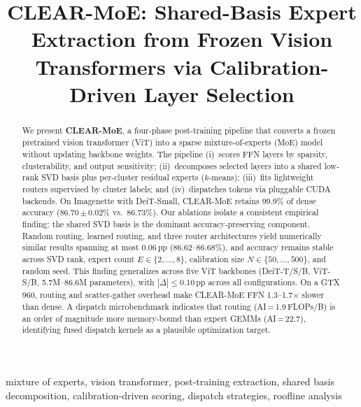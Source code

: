 \documentclass[conference]{IEEEtran}
\begin{document}
\title{CLEAR-MoE: Shared-Basis Expert Extraction from Frozen Vision Transformers via Calibration-Driven Layer Selection}

\maketitle

\begin{abstract}
We present \textbf{CLEAR-MoE}, a four-phase post-training pipeline that converts a frozen pretrained vision transformer (ViT) into a sparse mixture-of-experts (MoE) model without updating backbone weights. The pipeline (i)~scores FFN layers by sparsity, clusterability, and output sensitivity; (ii)~decomposes selected layers into a shared low-rank SVD basis plus per-cluster residual experts ($k$-means); (iii)~fits lightweight routers supervised by cluster labels; and (iv)~dispatches tokens via pluggable CUDA backends. On Imagenette with DeiT-Small, CLEAR-MoE retains 99.9\% of dense accuracy (86.70\,$\pm$\,0.02\% vs.\ 86.73\%). Our ablations isolate a consistent empirical finding: the shared SVD basis is the dominant accuracy-preserving component. Random routing, learned routing, and three router architectures yield numerically similar results spanning at most 0.06\,pp (86.62--86.68\%), and accuracy remains stable across SVD rank, expert count $E \in \{2,\ldots,8\}$, calibration size $N\in\{50,\ldots,500\}$, and random seed. This finding generalizes across five ViT backbones (DeiT-T/S/B, ViT-S/B, 5.7M--86.6M parameters), with $|\Delta|{\leq}0.10$\,pp across all configurations. On a GTX\,960, routing and scatter-gather overhead make CLEAR-MoE FFN 1.3--1.7$\times$ slower than dense. A dispatch microbenchmark indicates that routing (AI\,=\,1.9\,FLOPs/B) is an order of magnitude more memory-bound than expert GEMMs (AI\,=\,22.7), identifying fused dispatch kernels as a plausible optimization target.
\end{abstract}

\begin{IEEEkeywords}
mixture of experts, vision transformer, post-training extraction, shared basis decomposition, calibration-driven scoring, dispatch strategies, roofline analysis
\end{IEEEkeywords}

\end{document}
